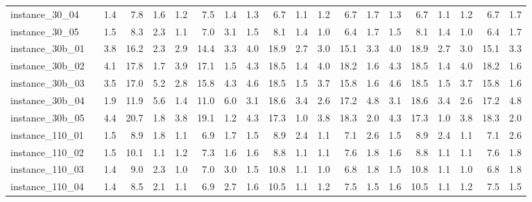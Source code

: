 \documentclass[12pt,a4paper,openright,twoside]{book}
\begin{document}
\begin{table}[H]
{\begin{tabular}{|ll|rrrrrr|rrrrrr|rrrrrr|}
instance\_30\_04              &     &    1.4  &   7.8  &  1.6  &   1.2  &   7.5  &  1.4   &     1.3  &   6.7  &  1.1  &   1.2  &   6.7  &  1.7  &   1.3  &   6.7  &  1.1  &   1.2  &   6.7  &  1.7\\   
instance\_30\_05              &     &    1.5  &   8.3  &  2.3  &   1.1  &   7.0  &  3.1   &     1.5  &   8.1  &  1.4  &   1.0  &   6.4  &  1.7  &   1.5  &   8.1  &  1.4  &   1.0  &   6.4  &  1.7\\  
instance\_30b\_01              &     &    3.8  &   16.2  &  2.3  &   2.9  &   14.4  &  3.3  &    4.0  &   18.9  &  2.7  &   3.0  &   15.1  &  3.3  &   4.0  &   18.9  &  2.7  &   3.0  &   15.1  &  3.3\\   
instance\_30b\_02              &     &    4.1  &   17.8  &  1.7  &   3.9  &   17.1  &  1.5  &    4.3  &   18.5  &  1.4  &   4.0  &   18.2  &  1.6  &   4.3  &   18.5  &  1.4  &   4.0  &   18.2  &  1.6\\   
instance\_30b\_03              &     &    3.5  &   17.0  &  5.2  &   2.8  &   15.8  &  4.3  &    4.6  &   18.5  &  1.5  &   3.7  &   15.8  &  1.6  &   4.6  &   18.5  &  1.5  &   3.7  &   15.8  &  1.6\\   
instance\_30b\_04              &     &    1.9  &   11.9  &  5.6  &   1.4  &   11.0  &  6.0  &    3.1  &   18.6  &  3.4  &   2.6  &   17.2  &  4.8  &   3.1  &   18.6  &  3.4  &   2.6  &   17.2  &  4.8\\   
instance\_30b\_05              &     &    4.4  &   20.7  &  1.8  &   3.8  &   19.1  &  1.2  &    4.3  &   17.3  &  1.0  &   3.8  &   18.3  &  2.0  &   4.3  &   17.3  &  1.0  &   3.8  &   18.3  &  2.0\\   
instance\_110\_01             &     &     1.5  &   8.9  &  1.8  &   1.1  &   6.9  &  1.7  &     1.5  &   8.9  &  2.4  &   1.1  &   7.1  &  2.6   &   1.5  &   8.9  &  2.4  &   1.1  &   7.1  &  2.6 \\      
instance\_110\_02             &     &    1.5  &   10.1  &  1.1  &   1.2  &   7.3  &  1.6  &     1.6  &   8.8  &  1.1  &   1.1  &   7.6  &  1.8   &   1.6  &   8.8  &  1.1  &   1.1  &   7.6  &  1.8 \\      
instance\_110\_03             &     &    1.4  &   9.0  &  2.3  &   1.0  &   7.0  &  3.0   &     1.5  &   10.8  &  1.1  &   1.0  &   6.8  &  1.8  &  1.5  &   10.8  &  1.1  &   1.0  &   6.8  &  1.8 \\      
instance\_110\_04             &     &    1.4  &   8.5  &  2.1  &   1.1  &   6.9  &  2.7   &     1.6  &   10.5  &  1.1  &   1.2  &   7.5  &  1.5  &   1.6  &   10.5  &  1.1  &   1.2  &   7.5  &  1.5 \\      

\end{tabular}}
\end{table}
\end{document}
